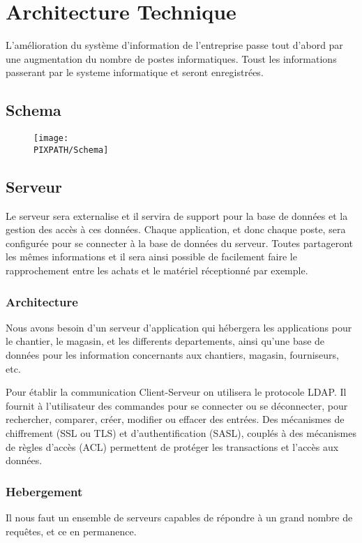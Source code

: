 \documentclass [a4paper] {report}
\begin{document}
\section{Architecture Technique}
L’amélioration du système d’information de l’entreprise passe tout d’abord par une augmentation du nombre de postes informatiques. Toust les informations passerant par le systeme informatique et seront enregistrées.

\subsection{Schema}

 \begin{figure}[!h]
    \begin{center}
    \texttt{[image: \\PIXPATH/Schema]}
    \caption{}
    \end{center}
    \end{figure}


\subsection{Serveur}

Le serveur sera externalise et il servira de support pour la base de données et la gestion des accès à ces données. Chaque application, et donc chaque poste, sera configurée pour se connecter à la base de données du serveur. Toutes partageront les mêmes informations et il sera ainsi possible de facilement faire le rapprochement entre les achats et le matériel réceptionné par exemple.

	\subsubsection{Architecture}
Nous avons besoin d'un serveur d'application qui hébergera les applications pour le chantier, le magasin, et les differents departements,  ainsi qu'une base de données pour les information concernants aux chantiers, magasin, fourniseurs, etc. 

Pour établir la communication Client-Serveur on utilisera le protocole LDAP. Il fournit à l'utilisateur des commandes pour se connecter ou se déconnecter,  pour rechercher, comparer, créer, modifier ou effacer des entrées. Des mécanismes de chiffrement (SSL ou TLS) et d'authentification (SASL), couplés à des mécanismes de règles d'accès (ACL) permettent de protéger les transactions et l'accès aux données.

	\subsubsection{Hebergement}
    Il nous faut un ensemble de serveurs capables de répondre à un grand
    nombre de requêtes, et ce en permanence.
\end{document}
